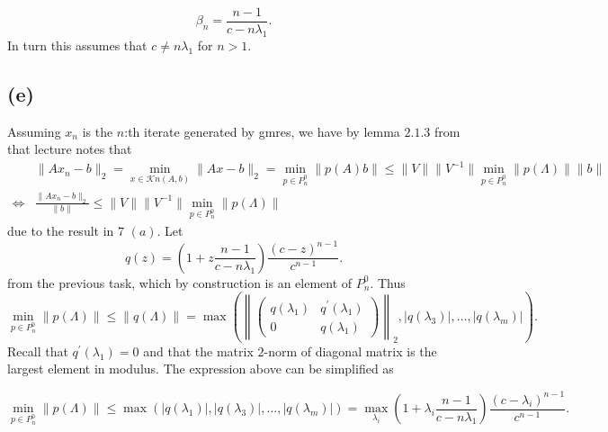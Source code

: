 \begin{equation}
  \beta_{n} =  \frac{n-1}{c-n\lambda_{1}}.
\end{equation}
In turn this assumes that $c \neq n \lambda_{1}$ for $n > 1$.

\subsection*{(e)}
Assuming $x_{n}$ is the $n$:th iterate generated by gmres, we have by lemma $2.1.3$ from that lecture notes that
\begin{align*}
  &\|Ax_{n}-b\|_{2} = \min\limits_{x \in \mathcal{K}{n}(A,b)}\|Ax - b\|_{2} = \min\limits_{p\in P_{n}^{0}}\|p(A)b\| \leq \|V\|\|V^{-1}\| \min\limits_{p\in P_{n}^{0}}\|p(\Lambda)\| \|b\|\\
  \Leftrightarrow& \frac{\|Ax_{n}-b\|_{2}}{\|b\|}\leq \|V\|\|V^{-1}\| \min\limits_{p\in P_{n}^{0}}\|p(\Lambda)\|
\end{align*}
due to the result in $7$ $(a)$. Let
\begin{equation}
q(z) = \left(1 + z \frac{n-1}{c-n\lambda_{1}}\right)\frac{(c-z)^{n-1}}{c^{n-1}}.
\end{equation}
from the previous task, which by construction is an element of $P_{n}^{0}$. Thus
\begin{equation}
  \min\limits_{p\in P_{n}^{0}}\|p(\Lambda)\| \leq \|q(\Lambda)\| =  \max \left(\left\|\begin{pmatrix}
     q(\lambda_{1}) &   q^{\prime}(\lambda_{1})\\
    0 &  q(\lambda_{1})\end{pmatrix} \right\|_{2},|q(\lambda_{3})|,\ldots,|q(\lambda_{m})|\right).
\end{equation}
Recall that $q^{\prime}(\lambda_{1}) = 0$ and that the matrix $2$-norm of diagonal matrix is the largest element in modulus. The expression above can be simplified as

\begin{equation}
  \label{eq:7f}
  \min\limits_{p\in P_{n}^{0}}\|p(\Lambda)\|\leq \max \left(|q(\lambda_{1})|,|q(\lambda_{3})|,\ldots,|q(\lambda_{m})|\right) = \max\limits_{\lambda_{i}} \left(1 + \lambda_{i} \frac{n-1}{c-n\lambda_{1}}\right)\frac{(c-\lambda_{i})^{n-1}}{c^{n-1}}.
\end{equation}

